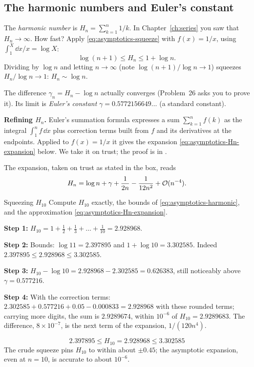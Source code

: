 \subsection{The harmonic numbers and Euler's constant}

The \emph{harmonic number} is $H_n=\sum_{k=1}^n1/k$. In Chapter~\ref{ch:series} you saw that $H_n\to\infty$. How fast? Apply \cref{eq:asymptotics-squeeze} with $f(x)=1/x$, using $\int_1^{X}\dd x/x=\log X$:
\begin{equation}
\log(n+1)\le H_n\le 1+\log n .
\label{eq:asymptotics-harmonic}
\end{equation}
Dividing by $\log n$ and letting $n\to\infty$ (note $\log(n+1)/\log n\to1$) squeezes $H_n/\log n\to1$: $H_n\sim\log n$.

The difference $\gamma_n=H_n-\log n$ actually converges (Problem~26 asks you to prove it). Its limit is \emph{Euler's constant} $\gamma=0.5772156649\ldots$ (a standard constant). \begin{beyond}
\textbf{Refining $H_n$.} Euler's summation formula expresses a sum $\sum_{k=1}^nf(k)$ as the integral $\int_1^nf\,\dd x$ plus correction terms built from $f$ and its derivatives at the endpoints. Applied to $f(x)=1/x$ it gives the expansion \cref{eq:asymptotics-Hn-expansion} below. We take it on trust; the proof is in \cite{apostol}.
\end{beyond}
\noindent The expansion, taken on trust as stated in the box, reads
\begin{equation}
H_n=\log n+\gamma+\frac{1}{2n}-\frac{1}{12n^2}+\mathcal{O}(n^{-4}).
\label{eq:asymptotics-Hn-expansion}
\end{equation}

\begin{sample}{Squeezing $H_{10}$}
Compute $H_{10}$ exactly, the bounds of \cref{eq:asymptotics-harmonic}, and the approximation \cref{eq:asymptotics-Hn-expansion}.

\textbf{Step 1:} $H_{10}=1+\tfrac12+\tfrac13+\dots+\tfrac1{10}=2.928968$.

\textbf{Step 2:} Bounds: $\log 11=2.397895$ and $1+\log10=3.302585$. Indeed $2.397895\le2.928968\le3.302585$.

\textbf{Step 3:} $H_{10}-\log10=2.928968-2.302585=0.626383$, still noticeably above $\gamma=0.577216$.

\textbf{Step 4:} With the correction terms: $2.302585+0.577216+0.05-0.000833=2.928968$ with these rounded terms; carrying more digits, the sum is $2.9289674$, within $10^{-6}$ of $H_{10}=2.9289683$. The difference, $8\times10^{-7}$, is the next term of the expansion, $1/(120n^4)$.

\[
\boxed{2.397895\le H_{10}=2.928968\le 3.302585}
\]
The crude squeeze pins $H_{10}$ to within about $\pm0.45$; the asymptotic expansion, even at $n=10$, is accurate to about $10^{-6}$.
\end{sample}


